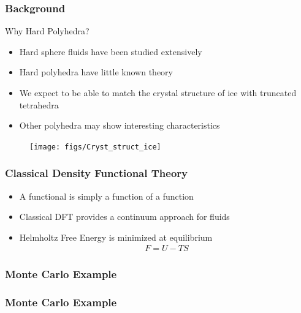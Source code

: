 \documentclass[handout]{beamer}
\begin{document}
\begin{frame}
  \frametitle{Background}
  Why Hard Polyhedra?
  \begin{itemize}
  \item<1-> Hard sphere fluids have been studied extensively
  \item<2-> Hard polyhedra have little known theory
  \item<3-> We expect to be able to match the crystal structure of ice with truncated tetrahedra
  \item<4-> Other polyhedra may show interesting characteristics
  \end{itemize}
  \begin{figure}[h]
    \raggedleft
    \texttt{[image: figs/Cryst\_struct\_ice]}
  \end{figure}
\end{frame}
\begin{frame}
  \frametitle{Classical Density Functional Theory}
  \begin{itemize}
  \item<1-> A functional is simply a function of a function
  \item<2-> Classical DFT provides a continuum approach for fluids
  \item<3-> Helmholtz Free Energy is minimized at equilibrium
    \begin{align*}
      F = U - TS
    \end{align*}
  \end{itemize}
\end{frame}


\begin{frame}
  \frametitle{Monte Carlo Example}
  \begin{figure}[h]
    \centering
  \end{figure}

\end{frame}

\begin{frame}
  \frametitle{Monte Carlo Example}
  \begin{figure}[h]
    \centering
  \end{figure}

\end{frame}
\end{document}
